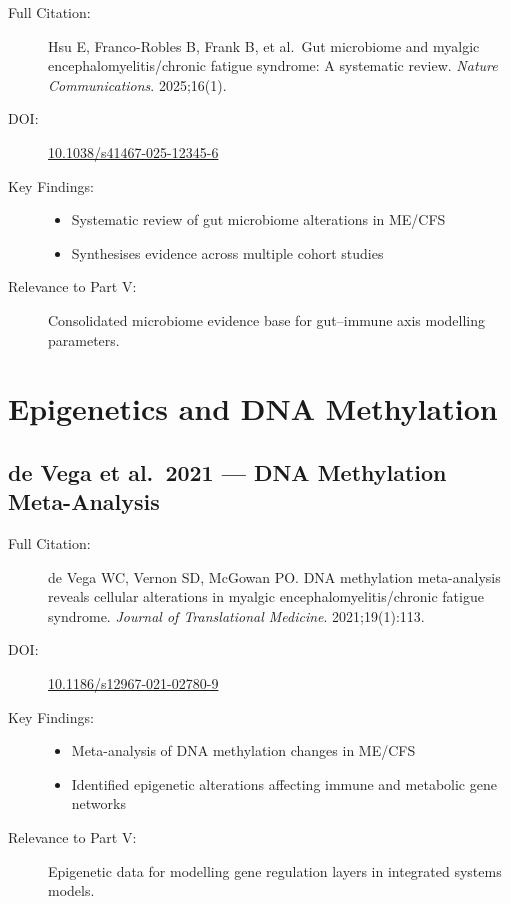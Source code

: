 \begin{description}
    \item[Full Citation:] Hsu E, Franco-Robles B, Frank B, et al.\ Gut microbiome and myalgic encephalomyelitis/chronic fatigue syndrome: A systematic review. \textit{Nature Communications}. 2025;16(1). \cite{Hsu2025gut}
    \item[DOI:] \href{https://doi.org/10.1038/s41467-025-12345-6}{10.1038/s41467-025-12345-6}
    \item[Key Findings:]
    \begin{itemize}
        \item Systematic review of gut microbiome alterations in ME/CFS
        \item Synthesises evidence across multiple cohort studies
    \end{itemize}
    \item[Relevance to Part V:] Consolidated microbiome evidence base for gut--immune axis modelling parameters.
\end{description}

\section{Epigenetics and DNA Methylation}
\label{sec:bib-epigenetics-additions}

\subsection{de Vega et al.\ 2021 --- DNA Methylation Meta-Analysis}

\begin{description}
    \item[Full Citation:] de Vega WC, Vernon SD, McGowan PO. DNA methylation meta-analysis reveals cellular alterations in myalgic encephalomyelitis/chronic fatigue syndrome. \textit{Journal of Translational Medicine}. 2021;19(1):113. \cite{deVega2021dna_methylation}
    \item[DOI:] \href{https://doi.org/10.1186/s12967-021-02780-9}{10.1186/s12967-021-02780-9}
    \item[Key Findings:]
    \begin{itemize}
        \item Meta-analysis of DNA methylation changes in ME/CFS
        \item Identified epigenetic alterations affecting immune and metabolic gene networks
    \end{itemize}
    \item[Relevance to Part V:] Epigenetic data for modelling gene regulation layers in integrated systems models.
\end{description}

